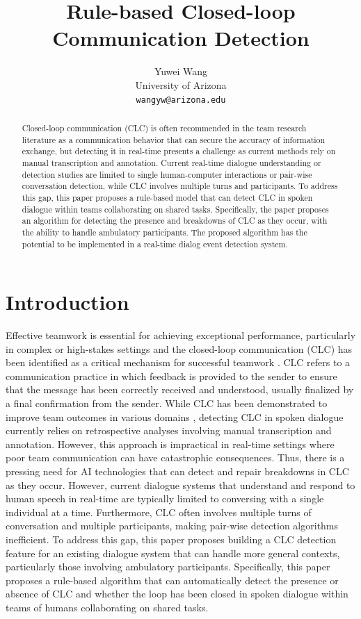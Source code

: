 \documentclass[11pt]{article}
\title{Rule-based Closed-loop Communication Detection}
\author{Yuwei Wang \\
  University of Arizona \\
  \texttt{wangyw@arizona.edu}}
\begin{document}
\maketitle
\begin{abstract}
Closed-loop communication (CLC) is often recommended in the team research literature as a communication behavior that can secure the accuracy of information exchange, but detecting it in real-time presents a challenge as current methods rely on manual transcription and annotation. Current real-time dialogue understanding or detection studies are limited to single human-computer interactions or pair-wise conversation detection, while CLC involves multiple turns and participants. To address this gap, this paper proposes a rule-based model that can detect CLC in spoken dialogue within teams collaborating on shared tasks. Specifically, the paper proposes an algorithm for detecting the presence and breakdowns of CLC as they occur, with the ability to handle ambulatory participants. The proposed algorithm has the potential to be implemented in a real-time dialog event detection system.
\end{abstract}

\section{Introduction}

Effective teamwork is essential for achieving exceptional performance, particularly in complex or high-stakes settings and the closed-loop communication (CLC) has been identified as a critical mechanism for successful teamwork \citep{salas2005there}. CLC refers to a communication practice in which feedback is provided to the sender to ensure that the message has been correctly received and understood, usually finalized by a final confirmation from the sender. While CLC has been demonstrated to improve team outcomes in various domains \citep{hargestam2016trauma, abd2018closed, bostrom2020mind}, detecting CLC in spoken dialogue currently relies on retrospective analyses involving manual transcription and annotation. However, this approach is impractical in real-time settings where poor team communication can have catastrophic consequences. Thus, there is a pressing need for AI technologies that can detect and repair breakdowns in CLC as they occur. However, current dialogue systems that understand and respond to human speech in real-time are typically limited to conversing with a single individual at a time. Furthermore, CLC often involves multiple turns of conversation and multiple participants, making pair-wise detection algorithms inefficient. To address this gap, this paper proposes building a CLC detection feature for an existing dialogue system that can handle more general contexts, particularly those involving ambulatory participants. Specifically, this paper proposes a rule-based algorithm that can automatically detect the presence or absence of CLC and whether the loop has been closed in spoken dialogue within teams of humans collaborating on shared tasks.
\end{document}
